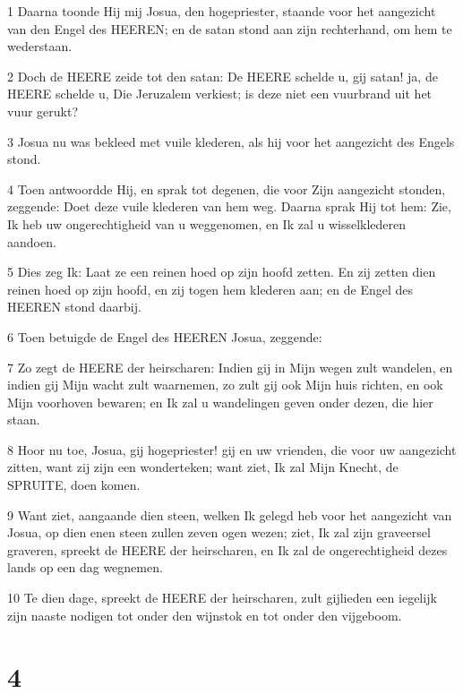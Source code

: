 \par 1 Daarna toonde Hij mij Josua, den hogepriester, staande voor het aangezicht van den Engel des HEEREN; en de satan stond aan zijn rechterhand, om hem te wederstaan.
\par 2 Doch de HEERE zeide tot den satan: De HEERE schelde u, gij satan! ja, de HEERE schelde u, Die Jeruzalem verkiest; is deze niet een vuurbrand uit het vuur gerukt?
\par 3 Josua nu was bekleed met vuile klederen, als hij voor het aangezicht des Engels stond.
\par 4 Toen antwoordde Hij, en sprak tot degenen, die voor Zijn aangezicht stonden, zeggende: Doet deze vuile klederen van hem weg. Daarna sprak Hij tot hem: Zie, Ik heb uw ongerechtigheid van u weggenomen, en Ik zal u wisselklederen aandoen.
\par 5 Dies zeg Ik: Laat ze een reinen hoed op zijn hoofd zetten. En zij zetten dien reinen hoed op zijn hoofd, en zij togen hem klederen aan; en de Engel des HEEREN stond daarbij.
\par 6 Toen betuigde de Engel des HEEREN Josua, zeggende:
\par 7 Zo zegt de HEERE der heirscharen: Indien gij in Mijn wegen zult wandelen, en indien gij Mijn wacht zult waarnemen, zo zult gij ook Mijn huis richten, en ook Mijn voorhoven bewaren; en Ik zal u wandelingen geven onder dezen, die hier staan.
\par 8 Hoor nu toe, Josua, gij hogepriester! gij en uw vrienden, die voor uw aangezicht zitten, want zij zijn een wonderteken; want ziet, Ik zal Mijn Knecht, de SPRUITE, doen komen.
\par 9 Want ziet, aangaande dien steen, welken Ik gelegd heb voor het aangezicht van Josua, op dien enen steen zullen zeven ogen wezen; ziet, Ik zal zijn graveersel graveren, spreekt de HEERE der heirscharen, en Ik zal de ongerechtigheid dezes lands op een dag wegnemen.
\par 10 Te dien dage, spreekt de HEERE der heirscharen, zult gijlieden een iegelijk zijn naaste nodigen tot onder den wijnstok en tot onder den vijgeboom.

\chapter{4}

